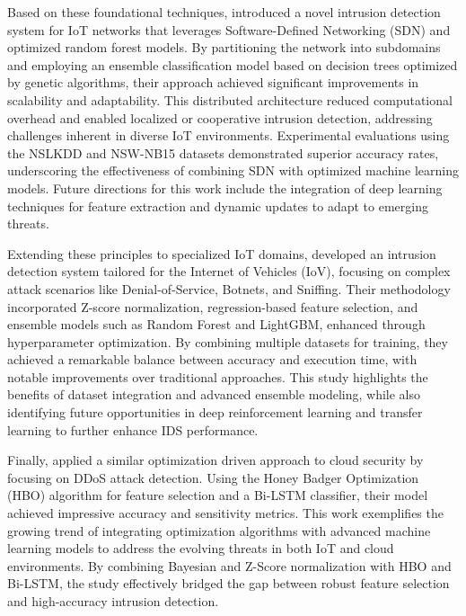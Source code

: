 Based on these foundational techniques, \citet{majidian2024optimizing} introduced a novel intrusion detection system for IoT networks that leverages Software-Defined Networking (SDN) and optimized random forest models. By partitioning the network into subdomains and employing an ensemble classification model based on decision trees optimized by genetic algorithms, their approach achieved significant improvements in scalability and adaptability. This distributed architecture reduced computational overhead and enabled localized or cooperative intrusion detection, addressing challenges inherent in diverse IoT environments. Experimental evaluations using the NSLKDD and NSW-NB15 datasets demonstrated superior accuracy rates, underscoring the effectiveness of combining SDN with optimized machine learning models. Future directions for this work include the integration of deep learning techniques for feature extraction and dynamic updates to adapt to emerging threats.

Extending these principles to specialized IoT domains, \citet{korium2024intrusion} developed an intrusion detection system tailored for the Internet of Vehicles (IoV), focusing on complex attack scenarios like Denial-of-Service, Botnets, and Sniffing. Their methodology incorporated Z-score normalization, regression-based feature selection, and ensemble models such as Random Forest and LightGBM, enhanced through hyperparameter optimization. By combining multiple datasets for training, they achieved a remarkable balance between accuracy and execution time, with notable improvements over traditional approaches. This study highlights the benefits of dataset integration and advanced ensemble modeling, while also identifying future opportunities in deep reinforcement learning and transfer learning to further enhance IDS performance.

Finally, \citet{pandithurai2024ddos} applied a similar optimization driven approach to cloud security by focusing on DDoS attack detection. Using the Honey Badger Optimization (HBO) algorithm for feature selection and a Bi-LSTM classifier, their model achieved impressive accuracy and sensitivity metrics. This work exemplifies the growing trend of integrating optimization algorithms with advanced machine learning models to address the evolving threats in both IoT and cloud environments. By combining Bayesian and Z-Score normalization with HBO and Bi-LSTM, the study effectively bridged the gap between robust feature selection and high-accuracy intrusion detection.

